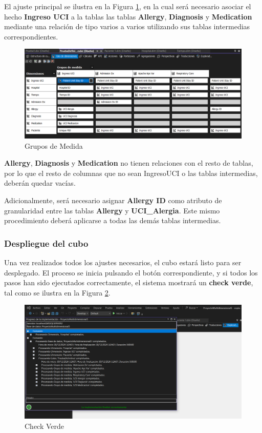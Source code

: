\documentclass[12pt, a4paper, twoside]{article}
\begin{document}
El ajuste principal se ilustra en la Figura \ref{fig:30}, en la cual será necesario asociar el hecho \textbf{Ingreso UCI} a la tablas  las tablas \textbf{Allergy}, \textbf{Diagnosis} y \textbf{Medication} mediante una relación de tipo varios a varios utilizando sus tablas intermedias correspondientes.

\begin{figure}[H]
	\centering
	\includegraphics[width=1\textwidth]{image/gruposMedida}
	\caption{Grupos de Medida}
	\label{fig:30}
\end{figure}

\textbf{Allergy}, \textbf{Diagnosis} y \textbf{Medication} no tienen relaciones con el resto de tablas, por lo que el resto de columnas que no sean IngresoUCI o las tablas intermedias, deberán quedar vacías.

Adicionalmente, será necesario asignar \textbf{Allergy ID} como atributo de granularidad entre las tablas \textbf{Allergy} y \textbf{UCI\_Alergia}. Este mismo procedimiento deberá aplicarse a todas las demás tablas intermedias.

\subsubsection{Despliegue del cubo}

Una vez realizados todos los ajustes necesarios, el cubo estará listo para ser desplegado. El proceso se inicia pulsando el botón correspondiente, y si todos los pasos han sido ejecutados correctamente, el sistema mostrará un \textbf{check verde}, tal como se ilustra en la Figura \ref{fig:31}.

\begin{figure}[H]
	\centering
	\includegraphics[width=1\textwidth]{image/checkVerde}
	\caption{Check Verde}
	\label{fig:31}
\end{figure}
\end{document}
